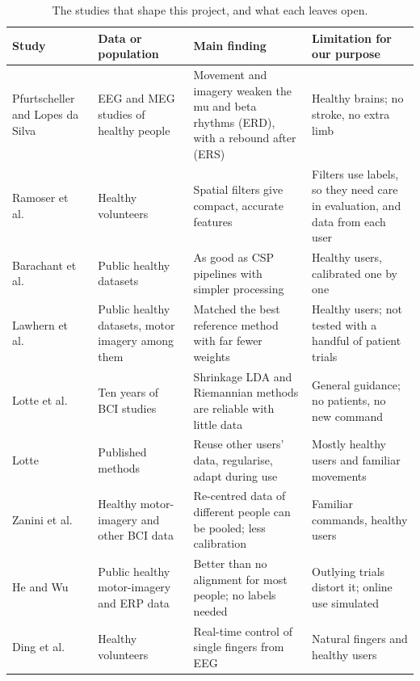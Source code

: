 \begin{table}[tbp]
  \centering
  \caption{The studies that shape this project, and what each leaves open.}
  \label{tab:lit}
  \begingroup\footnotesize{}\renewcommand{\arraystretch}{1.1}
  \begin{tabularx}{\textwidth}{@{}>{\raggedright\arraybackslash}p{2.3cm}>{\raggedright\arraybackslash}p{3.0cm}>{\raggedright\arraybackslash}X>{\raggedright\arraybackslash}X@{}}
    \toprule
    Study & Data or population & Main finding & Limitation for our purpose \\
    \midrule
    Pfurtscheller and Lopes da Silva~\cite{pfurtscheller1999} & EEG and MEG studies of healthy people & Movement and imagery weaken the mu and beta rhythms (ERD), with a rebound after (ERS) & Healthy brains; no stroke, no extra limb \\
    Ramoser et al.~\cite{ramoser2000} & Healthy volunteers & Spatial filters give compact, accurate features & Filters use labels, so they need care in evaluation, and data from each user \\
    Barachant et al.~\cite{barachant2012} & Public healthy datasets & As good as CSP pipelines with simpler processing & Healthy users, calibrated one by one \\
    Lawhern et al.~\cite{lawhern2018} & Public healthy datasets, motor imagery among them & Matched the best reference method with far fewer weights & Healthy users; not tested with a handful of patient trials \\
    Lotte et al.~\cite{lotte2018review} & Ten years of BCI studies & Shrinkage LDA and Riemannian methods are reliable with little data & General guidance; no patients, no new command \\
    Lotte~\cite{lotte2015} & Published methods & Reuse other users' data, regularise, adapt during use & Mostly healthy users and familiar movements \\
    Zanini et al.~\cite{zanini2018} & Healthy motor-imagery and other BCI data & Re-centred data of different people can be pooled; less calibration & Familiar commands, healthy users \\
    He and Wu~\cite{he2020} & Public healthy motor-imagery and ERP data & Better than no alignment for most people; no labels needed & Outlying trials distort it; online use simulated \\
    Ding et al.~\cite{ding2025} & Healthy volunteers & Real-time control of single fingers from EEG & Natural fingers and healthy users \\

\end{tabularx}
\end{table}
